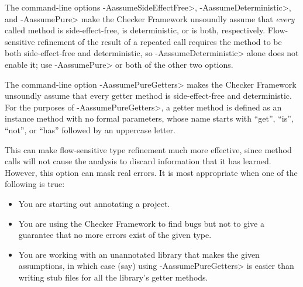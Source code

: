 
The command-line options \<-AassumeSideEffectFree>,
\<-AassumeDeterministic>, and \<-AassumePure> make the Checker Framework
unsoundly assume that \emph{every} called method is side-effect-free, is
deterministic, or is both, respectively.
Flow-sensitive refinement of the result of a repeated call requires the
method to be both side-effect-free and deterministic, so
\<-AassumeDeterministic> alone does not enable it; use \<-AassumePure> or
both of the other two options.

The command-line option \<-AassumePureGetters> makes the Checker Framework
unsoundly assume that every getter method is side-effect-free and
deterministic.  For the purposes of \<-AassumePureGetters>, a getter method
is defined as an instance method with no formal parameters, whose name
starts with ``get'', ``is'', ``not'', or ``has'' followed by an uppercase
letter.

This can make
flow-sensitive type refinement much more effective, since method calls will
not cause the analysis to discard information that it has learned.
However, this option can mask real errors.  It is most appropriate when one
of the following is true:
\begin{itemize}
\item
  You are starting out annotating a project.
\item
  You are using the Checker Framework to find bugs but not to give a
  guarantee that no more errors exist of the given type.
\item
  You are working with an unannotated library that makes the given
  assumptions, in which case (say) using \<-AassumePureGetters> is easier
  than writing stub files for all the library's getter methods.
\end{itemize}


